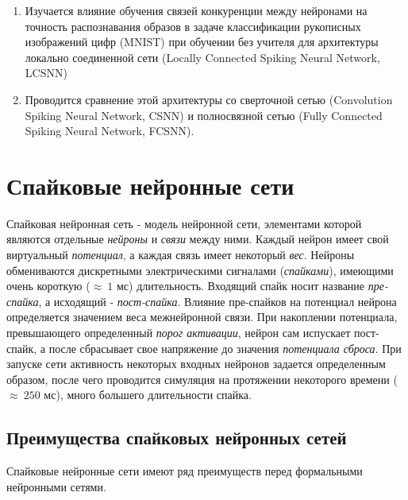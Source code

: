 \documentclass[a4paper]{article}
\begin{document}
\begin{enumerate}
 \item Изучается влияние обучения связей конкуренции \cite{MaxActiv1} \cite{MaxActiv2} между нейронами на точность распознавания образов в задаче классификации рукописных изображений цифр (MNIST) при обучении без учителя для архитектуры локально соединенной сети (Locally Connected Spiking Neural Network, LCSNN) \cite{saunders2019locally}
 
 \item Проводится сравнение этой архитектуры со сверточной сетью (Convolution Spiking Neural Network, CSNN) и полносвязной сетью (Fully Connected Spiking Neural Network, FCSNN).

\end{enumerate}

\clearpage 

\section{Спайковые нейронные сети}
Спайковая нейронная сеть - модель нейронной сети, элементами которой являются  отдельные \textit{нейроны} и \textit{связи} между ними. Каждый нейрон имеет свой виртуальный \textit{потенциал}, а каждая связь имеет некоторый \textit{вес}. Нейроны обмениваются дискретными электрическими сигналами (\textit{спайками}), имеющими очень короткую ($ \approx ~1$ мс) длительность. Входящий спайк носит название \textit{пре-спайка}, а исходящий - \textit{пост-спайка}.  Влияние пре-спайков на потенциал нейрона определяется значением веса межнейронной связи. При накоплении потенциала, превышающего определенный \textit{порог активации}, нейрон сам испускает пост-спайк, а после сбрасывает свое напряжение до значения \textit{потенциала сброса}. При запуске сети активность некоторых входных нейронов задается определенным образом, после чего проводится симуляция на протяжении некоторого времени ($\approx ~250$ мс), много большего длительности спайка.

\subsection{Преимущества спайковых нейронных сетей} 
Спайковые нейронные сети имеют ряд преимуществ перед формальными нейронными сетями.
\end{document}
